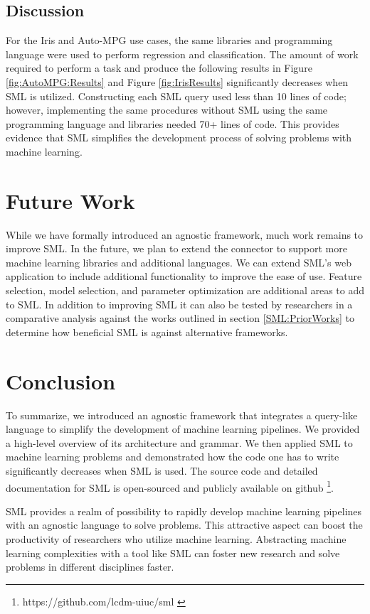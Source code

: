 \subsection{Discussion}
For the Iris and Auto-MPG use cases, the same libraries and programming language were used to perform regression and classification.  The amount of work required to perform a task and produce the following results in Figure \ref{fig:AutoMPG:Results} and Figure \ref{fig:IrisResults} significantly decreases when SML is utilized.  Constructing each SML query used less than 10 lines of code; however, implementing the same procedures without SML using the same programming language and libraries needed 70+ lines of code.  This provides evidence that SML simplifies the development process of solving problems with machine learning.  

\section{Future Work}
While we have formally introduced an agnostic framework, much work remains to improve SML.  In the future, we plan to extend the connector to support more machine learning libraries and additional languages.  We can extend SML's web application to include additional functionality to improve the ease of use.  Feature selection, model selection, and parameter optimization are additional areas to add to SML.  In addition to improving SML it can also be tested by researchers in a comparative analysis against the works outlined in section \ref{SML:PriorWorks} to determine how beneficial SML is against alternative frameworks.

\section{Conclusion}
\label{conclusion}
To summarize, we introduced an agnostic framework that integrates a query-like language to simplify the development of machine learning pipelines.  We provided a high-level overview of its architecture and grammar. We then applied SML to machine learning problems and demonstrated how the code one has to write significantly decreases when SML is used.  The source code and detailed documentation for SML is open-sourced and publicly available on github \footnote{https://github.com/lcdm-uiuc/sml \label{SML:Github}}. 


SML provides a realm of possibility to rapidly develop machine learning pipelines with an agnostic language to solve problems. This attractive aspect can boost the productivity of researchers who utilize machine learning.  Abstracting machine learning complexities with a tool like SML can foster new research and solve problems in different disciplines faster.


